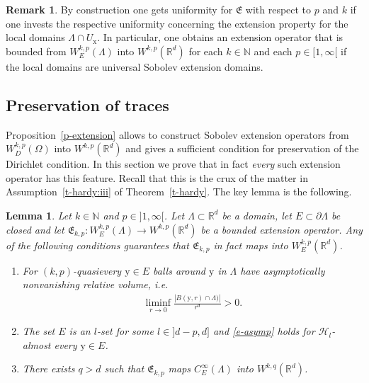 \documentclass[10pt,leqno]{amsart}
\newtheorem{lemma}[theorem]{Lemma}
\theoremstyle{definition}
\newtheorem{remark}[theorem]{Remark}
\numberwithin{equation}{section}
\begin{document}
\begin{remark} \label{r-unif}
By construction one gets uniformity for $\mathfrak{E}$ with respect to $p$ and
$k$ if one invests the respective uniformity concerning the extension property
for the local domains $\Lambda \cap U_{{\mathrm x}}$. In particular, one obtains an
extension operator that is bounded from $W_E^{k,p}(\Lambda)$ into
$W^{k,p}({{\mathbb R}}^d)$ for each $k \in {{\mathbb N}}$ and each $p \in {[1,\infty[}$ if the local
domains are universal Sobolev extension domains.
\end{remark}

\subsection{Preservation of traces} \label{Subsec: preservation of traces}
Proposition~\ref{p-extension} allows to construct Sobolev extension operators
from $W^{k,p}_D(\Omega)$ into $W^{k, p}({{\mathbb R}}^d)$ and gives a sufficient condition
for preservation of the Dirichlet condition. In this section we prove that in
fact \emph{every} such extension operator has this feature. Recall that this is
the crux of the matter in Assumption~\ref{t-hardy:iii} of
Theorem~\ref{t-hardy}.
The key lemma is the following.

\begin{lemma} \label{l-trace}
Let $k \in {{\mathbb N}}$ and $p \in {]1,\infty[}$. Let $\Lambda \subset {{\mathbb R}}^d$ be a
domain, let $E \subset \partial \Lambda$ be closed and let $\mathfrak{E}_{k,p}:
W^{k,p}_E(\Lambda) \to W^{k,p}({{\mathbb R}}^d)$ be a bounded extension operator. Any of
the following conditions guarantees that $\mathfrak{E}_{k,p}$ in fact maps into
$W_E^{k,p}({{\mathbb R}}^d)$.
\begin{enumerate}
 \item For $(k,p)$-quasievery ${{\mathrm y}} \in E$ balls around $\mathrm y$ in
 $\Lambda$ have \emph{asymptotically nonvanishing relative volume}, i.e.
 \begin{align} \label{e-asymp}
  \liminf_{r \to 0} \frac {|B({{\mathrm y}}, r) \cap \Lambda)|}{r^d} > 0.
 \end{align}

 \item The set $E$ is an $l$-set for some $l \in {]d-p,d]}$ and \eqref{e-asymp}
 holds for ${\mathcal{H}}_l$-almost every ${{\mathrm y}} \in E$.

 \item There exists $q > d$ such that $\mathfrak{E}_{k,p}$ maps
 $C_E^\infty(\Lambda)$ into $W^{k,q}({{\mathbb R}}^d)$.
\end{enumerate}
\end{lemma}
\end{document}
